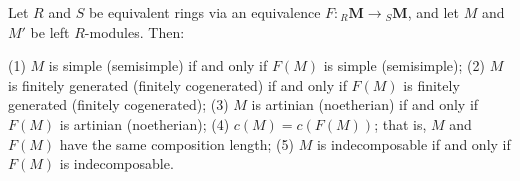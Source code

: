Let $R$ and $S$ be equivalent rings via an equivalence $F: {}_R \mathbf{M} \to {}_S \mathbf{M}$, and let $M$ and $M'$ be left $R$-modules. Then:

(1) $M$ is simple (semisimple) if and only if $F(M)$ is simple (semisimple);
(2) $M$ is finitely generated (finitely cogenerated) if and only if $F(M)$ is finitely generated (finitely cogenerated);
(3) $M$ is artinian (noetherian) if and only if $F(M)$ is artinian (noetherian);
(4) $c(M) = c(F(M))$; that is, $M$ and $F(M)$ have the same composition length;
(5) $M$ is indecomposable if and only if $F(M)$ is indecomposable.
